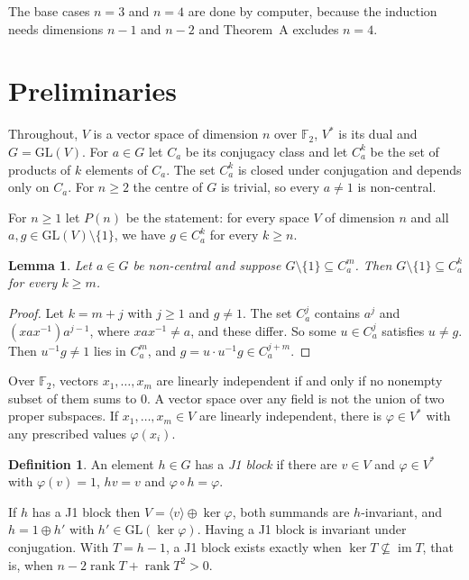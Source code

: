 \documentclass[11pt]{amsart}
\newtheorem{lemma}[theorem]{Lemma}
\theoremstyle{definition}
\newtheorem{definition}[theorem]{Definition}
\theoremstyle{remark}
\newcommand{\F}{\mathbb{F}_2}
\newcommand{\GL}{\mathrm{GL}}
\newcommand{\rk}{\operatorname{rank}}
\begin{document}
The base cases $n=3$ and $n=4$ are done by computer, because the induction needs dimensions $n-1$
and $n-2$ and Theorem~A excludes $n=4$.

\section{Preliminaries}\label{sec:prelim}

Throughout, $V$ is a vector space of dimension $n$ over $\F$, $V^*$ is its dual and
$G=\GL(V)$. For $a\in G$ let $C_a$ be its conjugacy class and let $C_a^k$ be the set of products
of $k$ elements of $C_a$. The set $C_a^k$ is closed under conjugation and depends only on $C_a$.
For $n\ge2$ the centre of $G$ is trivial, so every $a\ne1$ is non-central.

For $n\ge 1$ let $P(n)$ be the statement: for every space $V$ of dimension $n$ and all
$a,g\in\GL(V)\setminus\{1\}$, we have $g\in C_a^k$ for every $k\ge n$.

\begin{lemma}\label{lem:more}
Let $a\in G$ be non-central and suppose $G\setminus\{1\}\subseteq C_a^m$. Then
$G\setminus\{1\}\subseteq C_a^k$ for every $k\ge m$.
\end{lemma}

\begin{proof}
Let $k=m+j$ with $j\ge1$ and $g\ne1$. The set $C_a^j$ contains $a^j$ and $(xax^{-1})a^{j-1}$, where
$xax^{-1}\ne a$, and these differ. So some $u\in C_a^j$ satisfies $u\ne g$. Then $u^{-1}g\ne1$
lies in $C_a^m$, and $g=u\cdot u^{-1}g\in C_a^{j+m}$.
\end{proof}

Over $\F$, vectors $x_1,\dots,x_m$ are linearly independent if and only if no nonempty subset of
them sums to $0$. A vector space over any field is not the union of two proper subspaces. If
$x_1,\dots,x_m\in V$ are linearly independent, there is $\varphi\in V^*$ with any prescribed values
$\varphi(x_i)$.

\begin{definition}
An element $h\in G$ has a \emph{J1 block} if there are $v\in V$ and $\varphi\in V^*$ with
$\varphi(v)=1$, $hv=v$ and $\varphi\circ h=\varphi$.
\end{definition}

If $h$ has a J1 block then $V=\langle v\rangle\oplus\ker\varphi$, both summands are
$h$-invariant, and $h=1\oplus h'$ with $h'\in\GL(\ker\varphi)$. Having a J1 block is invariant
under conjugation. With $T=h-1$, a J1 block exists exactly when $\ker T\not\subseteq\operatorname{im}T$,
that is, when $n-2\rk T+\rk T^2>0$.
\end{document}
